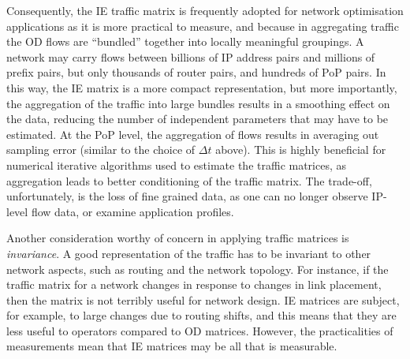 Consequently, the IE traffic matrix is frequently adopted for network
optimisation applications as it is more practical to measure, and
because in aggregating traffic the OD flows are ``bundled'' together
into locally meaningful groupings. A network may carry flows between
billions of IP address pairs and millions of prefix pairs, but only
thousands of router pairs, and hundreds of PoP pairs.  In this way,
the IE matrix is a more compact representation, but more importantly,
the aggregation of the traffic into large bundles results in a
smoothing effect on the data, reducing the number of independent
parameters that may have to be estimated. At the PoP level, the
aggregation of flows results in averaging out sampling error (similar
to the choice of $\Delta t$ above). This is highly beneficial for
numerical iterative algorithms used to estimate the traffic matrices,
as aggregation leads to better conditioning of the traffic matrix. The
trade-off, unfortunately, is the loss of fine grained data, as one can
no longer observe IP-level flow data, or examine application profiles.

Another consideration worthy of concern in applying traffic matrices
is {\em invariance}.  A good representation of the traffic has
to be invariant to other network aspects, such as routing and the
network topology. For instance, if the traffic matrix for a network
changes in response to changes in link placement, then the matrix is
not terribly useful for network design. IE matrices are subject, for
example, to large changes due to routing shifts, and this means that
they are less useful to operators compared to OD matrices. However,
the practicalities of measurements mean that IE matrices may be all
that is measurable.





